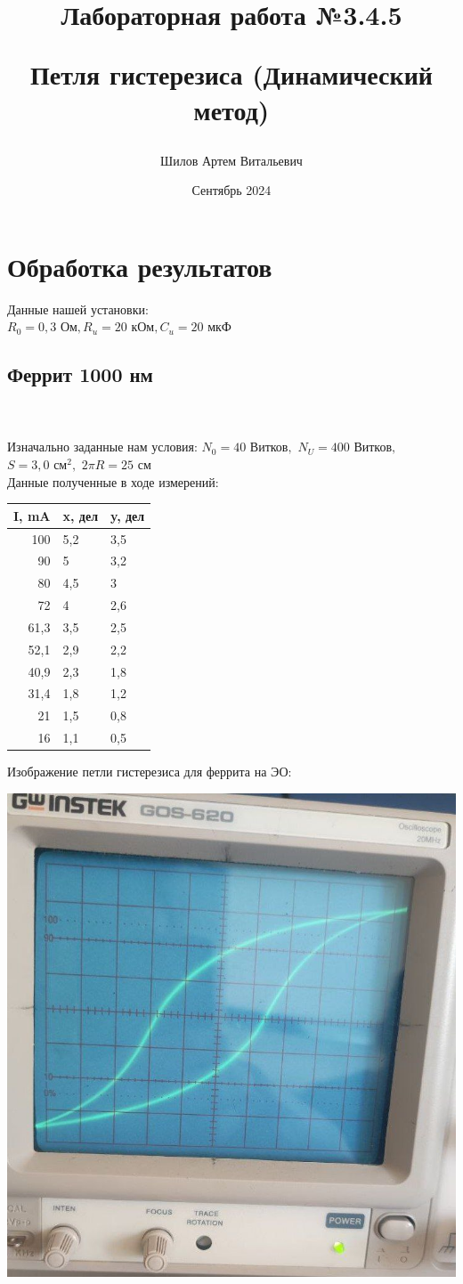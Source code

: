 \documentclass[a4paper, 12pt]{article}
\title{\begin{center}Лабораторная работа №3.4.5\end{center}
Петля гистерезиса (Динамический метод)}
\author{Шилов Артем Витальевич\\}
\date{Сентябрь 2024}
\begin{document}
    \maketitle
    

\section{Обработка результатов}
Данные нашей установки: \\
$R_0 = 0,3 \text{ Ом}, R_u = 20 \text{ кОм}, C_u = 20 \text{ мкФ}$

\subsection{Феррит 1000 нм} \\
\\ Изначально заданные нам условия: 
    $N_0 = 40 \text{ Витков},$ $ N_U = 400 \text{ Витков}, $ $ S = 3,0 \text{ см}^2, $ $ 2 \pi R = 25 \text{ см}$ \\
Данные полученные в ходе измерений:
\begin{center}
\begin{tabular}{|r|l|l|}
\hline
\multicolumn{1}{|l|}{I, mA} & x, дел & y, дел \\ \hline
100                         & 5,2    & 3,5    \\ \hline
90                          & 5      & 3,2    \\ \hline
80                          & 4,5    & 3      \\ \hline
72                          & 4      & 2,6    \\ \hline
61,3                        & 3,5    & 2,5    \\ \hline
52,1                        & 2,9    & 2,2    \\ \hline
40,9                        & 2,3    & 1,8    \\ \hline
31,4                        & 1,8    & 1,2    \\ \hline
21                          & 1,5    & 0,8    \\ \hline
16                          & 1,1    & 0,5    \\ \hline
\end{tabular}
\end{center}
Изображение петли гистерезиса для феррита на ЭО: 
\begin{center}
    \includegraphics[width=0.4\linewidth]{Ferrit.jpg}
    \caption{Рис. 1}
    \label{fig:enter-label}
\end{center}
\end{document}
